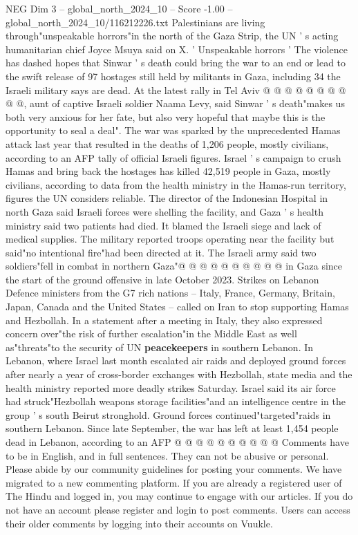 \begin{textsample}{NEG Dim 3 – global\_north\_2024\_10 – Score -1.00 – global\_north\_2024\_10/116212226.txt}
Palestinians are living through"unspeakable horrors"in the north of the Gaza Strip, the UN ' s acting humanitarian chief Joyce Msuya said on X. ' Unspeakable horrors ' The violence has dashed hopes that Sinwar ' s death could bring the war to an end or lead to the swift release of 97 hostages still held by militants in Gaza, including 34 the Israeli military says are dead.
At the latest rally in Tel Aviv @ @ @ @ @ @ @ @ @ @, aunt of captive Israeli soldier Naama Levy, said Sinwar ' s death"makes us both very anxious for her fate, but also very hopeful that maybe this is the opportunity to seal a deal".
The war was sparked by the unprecedented Hamas attack last year that resulted in the deaths of 1,206 people, mostly civilians, according to an AFP tally of official Israeli figures.
Israel ' s campaign to crush Hamas and bring back the hostages has killed 42,519 people in Gaza, mostly civilians, according to data from the health ministry in the Hamas-run territory, figures the UN considers reliable.
The director of the Indonesian Hospital in north Gaza said Israeli forces were shelling the facility, and Gaza ' s health ministry said two patients had died.
It blamed the Israeli siege and lack of medical supplies.
The military reported troops operating near the facility but said"no intentional fire"had been directed at it.
The Israeli army said two soldiers"fell in combat in northern Gaza"@ @ @ @ @ @ @ @ @ @ in Gaza since the start of the ground offensive in late October 2023.
Strikes on Lebanon Defence ministers from the G7 rich nations -- Italy, France, Germany, Britain, Japan, Canada and the United States -- called on Iran to stop supporting Hamas and Hezbollah.
In a statement after a meeting in Italy, they also expressed concern over"the risk of further escalation"in the Middle East as well as"threats"to the security of UN \textbf{peacekeepers} in southern Lebanon.
In Lebanon, where Israel last month escalated air raids and deployed ground forces after nearly a year of cross-border exchanges with Hezbollah, state media and the health ministry reported more deadly strikes Saturday.
Israel said its air force had struck"Hezbollah weapons storage facilities"and an intelligence centre in the group ' s south Beirut stronghold.
Ground forces continued"targeted"raids in southern Lebanon.
Since late September, the war has left at least 1,454 people dead in Lebanon, according to an AFP @ @ @ @ @ @ @ @ @ @ Comments have to be in English, and in full sentences.
They can not be abusive or personal.
Please abide by our community guidelines for posting your comments.
We have migrated to a new commenting platform.
If you are already a registered user of The Hindu and logged in, you may continue to engage with our articles.
If you do not have an account please register and login to post comments.
Users can access their older comments by logging into their accounts on Vuukle.

\end{textsample}
